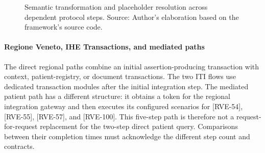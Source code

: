 \begin{figure}[H]
    \centering
    \caption[Semantic transformation and placeholder resolution]{Semantic transformation and placeholder resolution across dependent protocol steps. Source: Author's elaboration based on the framework's source code.}
    \label{fig:rdg-semantic-dependency}
\end{figure}

\paragraph{Regione Veneto, IHE Transactions, and mediated paths}
\noindent The direct regional paths combine an initial assertion-producing transaction
with context, patient-registry, or document transactions. The two ITI flows use
dedicated transaction modules after the initial integration step. The mediated
patient path has a different structure: it obtains a token for the regional
integration gateway and then executes its configured scenarios for [RVE-54],
[RVE-55], [RVE-57], and
[RVE-100]. This five-step path is therefore not a request-for-request replacement
for the two-step direct patient query. Comparisons between their completion
times must acknowledge the different step count and contracts.

